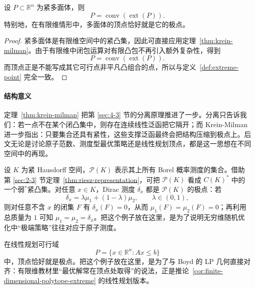 \begin{corollary}[有限维多面体的极点描述]\label{cor:finite-dimensional-polytope-extreme}
设 $P\subset\mathbb R^n$ 为紧多面体，则
\[
P=\operatorname{conv}(\operatorname{ext}(P)).
\]
特别地，在有限维情形中，多面体的顶点恰好就是它的极点。
\end{corollary}

\begin{proof}
紧多面体是有限维空间中的紧凸集，因此可直接应用定理~\ref{thm:krein-milman}。由于有限维中闭包运算对有限凸包不再引入额外复杂性，得到
\[
P=\operatorname{conv}(\operatorname{ext}(P)).
\]
而顶点正是不能写成其它可行点非平凡凸组合的点，所以与定义~\ref{def:extreme-point} 完全一致。
\end{proof}

\paragraph{结构意义}

\begin{remark}
定理~\ref{thm:krein-milman} 把第 \ref{sec:4-3} 节的分离原理推进了一步。分离只告诉我们：若一点不在某个闭凸集中，则存在连续线性泛函把它隔开；而 Krein-Milman 进一步指出：只要集合还具有紧性，这些支撑泛函最终会把结构压缩到极点上。后文无论是讨论原子范数、测度型最优策略还是线性规划顶点，都是这一思想在不同空间中的再现。
\end{remark}

\begin{example}\label{ex:dirac-extreme-point}
设 $K$ 为紧 Hausdorff 空间，$\mathcal P(K)$ 表示其上所有 Borel 概率测度的集合。借助第 \ref{sec:2-3} 节定理~\ref{thm:riesz-representation}，可把 $\mathcal P(K)$ 看成 $C(K)^\ast$ 中的一个弱$^\ast$紧凸集。对任意 $x\in K$，Dirac 测度 $\delta_x$ 都是 $\mathcal P(K)$ 的极点：若
\[
\delta_x=\lambda\mu_1+(1-\lambda)\mu_2,\qquad \lambda\in(0,1),
\]
则对任意不含 $x$ 的闭集 $F$ 有 $\delta_x(F)=0$，从而 $\mu_1(F)=\mu_2(F)=0$；再利用总质量为 $1$ 可知 $\mu_1=\mu_2=\delta_x$。把这个例子放在这里，是为了说明无穷维随机优化中“极端策略”往往对应于原子测度。
\end{example}

\begin{example}\label{ex:lp-vertex-extreme-point}
在线性规划可行域
\[
P=\{x\in\mathbb R^n:Ax\le b\}
\]
中，顶点恰好就是极点。把这个例子放在这里，是为了与 Boyd 的 LP 几何直接对齐：有限维教材里“最优解常在顶点处取得”的说法，正是推论~\ref{cor:finite-dimensional-polytope-extreme} 的线性规划版本。
\end{example}

